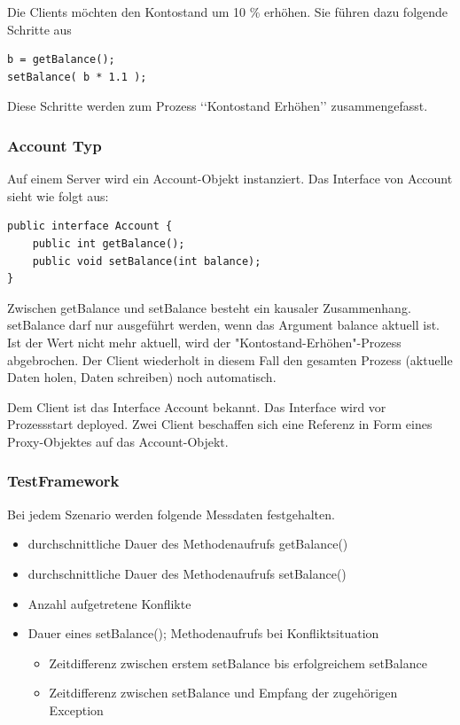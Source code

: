\documentclass{article}
\begin{document}
Die Clients möchten den Kontostand um 10 \% erhöhen. Sie führen dazu folgende Schritte aus
\begin{lstlisting}
b = getBalance();
setBalance( b * 1.1 );
\end{lstlisting}
Diese Schritte werden zum Prozess ‘‘Kontostand Erhöhen’’ zusammengefasst.

\subsubsection{Account Typ}
\label{sec:account-typ}

Auf einem Server wird ein Account-Objekt instanziert.
Das Interface von Account sieht wie folgt aus:
\begin{lstlisting}
public interface Account {
    public int getBalance();
    public void setBalance(int balance);    
}
\end{lstlisting}
Zwischen getBalance und setBalance besteht ein kausaler Zusammenhang. setBalance darf nur ausgeführt werden, wenn das Argument balance aktuell ist. Ist der Wert nicht mehr aktuell, wird der "Kontostand-Erhöhen"-Prozess abgebrochen. Der Client wiederholt in diesem Fall den gesamten Prozess (aktuelle Daten holen, Daten schreiben) noch automatisch.

Dem Client ist das Interface Account bekannt. Das Interface wird vor Prozessstart deployed.
Zwei Client beschaffen sich eine Referenz in Form eines Proxy-Objektes auf das Account-Objekt. 

\subsubsection{TestFramework}
\label{sec:testframework-1}


Bei jedem Szenario werden folgende Messdaten festgehalten.
\begin{itemize}
\item durchschnittliche Dauer des Methodenaufrufs getBalance()
\item durchschnittliche Dauer des Methodenaufrufs setBalance()
\item Anzahl aufgetretene Konflikte
\item Dauer eines setBalance(); Methodenaufrufs bei Konfliktsituation
  \begin{itemize}
  \item Zeitdifferenz zwischen erstem setBalance bis erfolgreichem setBalance
  \item Zeitdifferenz zwischen setBalance und Empfang der zugehörigen Exception
  \end{itemize}
\end{itemize}
\end{document}
